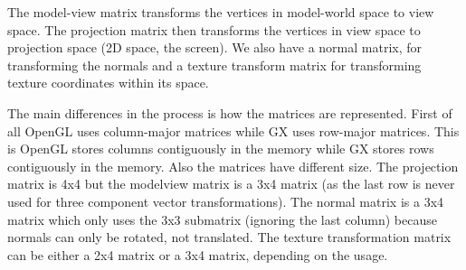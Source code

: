 \documentclass[12pt]{article}
\begin{document}
The model-view matrix transforms the vertices in model-world space to view space. The projection matrix then transforms the vertices in view space to projection space (2D space, the screen). We also have a normal matrix, for transforming the normals and a texture transform matrix for transforming texture coordinates within its space.

The main differences in the process is how the matrices are represented. First of all OpenGL uses column-major matrices while GX uses row-major matrices. This is OpenGL stores columns contiguously in the memory while GX stores rows contiguously in the memory. Also the matrices have different size. The projection matrix is 4x4 but the modelview matrix is a 3x4 matrix (as the last row is never used for three component vector transformations). The normal matrix is a 3x4 matrix which only uses the 3x3 submatrix (ignoring the last column) because normals can only be rotated, not translated. The texture transformation matrix can be either a 2x4 matrix or a 3x4 matrix, depending on the usage.
\end{document}
